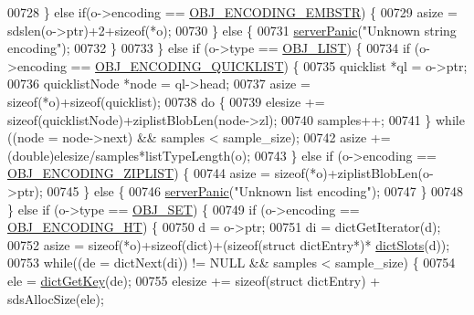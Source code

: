 \begin{DoxyCode}
{00728         \} \textcolor{keywordflow}{else} \textcolor{keywordflow}{if}(o->encoding == \hyperlink{server_8h_ac5bb76b546161fd0da4b0ff89b3142ee}{OBJ\_ENCODING\_EMBSTR}) \{
00729             asize = sdslen(o->ptr)+2+\textcolor{keyword}{sizeof}(*o);
00730         \} \textcolor{keywordflow}{else} \{
00731             \hyperlink{server_8h_a11cc378e7778a830b41240578de3b204}{serverPanic}(\textcolor{stringliteral}{"Unknown string encoding"});
00732         \}
00733     \} \textcolor{keywordflow}{else} \textcolor{keywordflow}{if} (o->type == \hyperlink{server_8h_a4a5f22a280949c97a0cb0d4213275126}{OBJ\_LIST}) \{
00734         \textcolor{keywordflow}{if} (o->encoding == \hyperlink{server_8h_aec792aeed6d4bf83966672e6a23043b8}{OBJ\_ENCODING\_QUICKLIST}) \{
00735             quicklist *ql = o->ptr;
00736             quicklistNode *node = ql->head;
00737             asize = \textcolor{keyword}{sizeof}(*o)+\textcolor{keyword}{sizeof}(quicklist);
00738             \textcolor{keywordflow}{do} \{
00739                 elesize += \textcolor{keyword}{sizeof}(quicklistNode)+ziplistBlobLen(node->zl);
00740                 samples++;
00741             \} \textcolor{keywordflow}{while} ((node = node->next) && samples < sample\_size);
00742             asize += (\textcolor{keywordtype}{double})elesize/samples*listTypeLength(o);
00743         \} \textcolor{keywordflow}{else} \textcolor{keywordflow}{if} (o->encoding == \hyperlink{server_8h_aabf064ede983103f1fd0df2086e84eee}{OBJ\_ENCODING\_ZIPLIST}) \{
00744             asize = \textcolor{keyword}{sizeof}(*o)+ziplistBlobLen(o->ptr);
00745         \} \textcolor{keywordflow}{else} \{
00746             \hyperlink{server_8h_a11cc378e7778a830b41240578de3b204}{serverPanic}(\textcolor{stringliteral}{"Unknown list encoding"});
00747         \}
00748     \} \textcolor{keywordflow}{else} \textcolor{keywordflow}{if} (o->type == \hyperlink{server_8h_a8d179375a4aac33d3fa7aa80c8ccc75f}{OBJ\_SET}) \{
00749         \textcolor{keywordflow}{if} (o->encoding == \hyperlink{server_8h_a9c10219f68afc557d510d108257d238b}{OBJ\_ENCODING\_HT}) \{
00750             d = o->ptr;
00751             di = dictGetIterator(d);
00752             asize = \textcolor{keyword}{sizeof}(*o)+\textcolor{keyword}{sizeof}(dict)+(\textcolor{keyword}{sizeof}(\textcolor{keyword}{struct} dictEntry*)*
      \hyperlink{dict_8h_aca9596be4bcc2caa07c17dd8cebcceec}{dictSlots}(d));
00753             \textcolor{keywordflow}{while}((de = dictNext(di)) != NULL && samples < sample\_size) \{
00754                 ele = \hyperlink{dict_8h_a3271c334309904a3086deca94f96e46e}{dictGetKey}(de);
00755                 elesize += \textcolor{keyword}{sizeof}(\textcolor{keyword}{struct} dictEntry) + sdsAllocSize(ele);
}
\end{DoxyCode}
